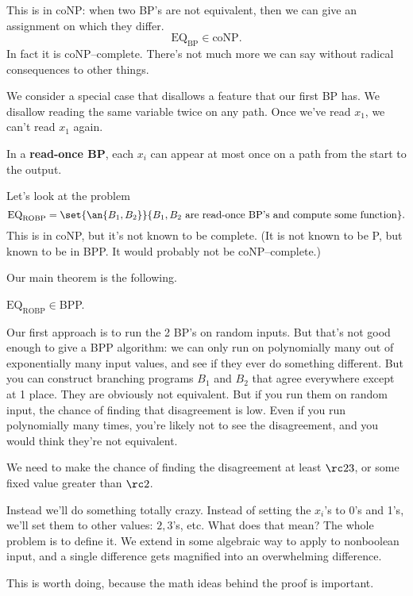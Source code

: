 
This is in coNP: when two BP's are not equivalent, then we can give an assignment on which they differ.
\[
\text{EQ}_{\text{BP}}\in \text{coNP}.
\]
In fact it is coNP--complete. 
There's not much more we can say without radical consequences to other things.

We consider a special case that disallows a feature that our first BP has. We disallow reading the same variable twice on any path. Once we've read $x_1$, we can't read $x_1$ again. %
\begin{df}
In a \textbf{read-once BP}, each $x_i$ can appear at most once on a path from the start to the output. %
\end{df}
Let's look at the problem
\[
\text{EQ}_{\text{ROBP}}=\set{\an{B_1,B_2}}{B_1,B_2\text{ are read-once BP's and compute some function}}.
\]
This is in coNP, but it's not known to be complete. (It is not known to be P, but known to be in BPP. It would probably not be coNP--complete.)

Our main theorem is the following.
\begin{thm}
$
\text{EQ}_{\text{ROBP}}\in $BPP.
\end{thm}
Our first approach is to run the 2 BP's on random inputs. But that's not good enough to give a BPP algorithm: we can only run on polynomially many out of exponentially many input values, and see if they ever do something different. But you can construct branching programs $B_1$ and $B_2$ that agree everywhere except at 1 place. They are obviously not equivalent. But if you run them on random input, the chance of finding that disagreement is low. Even if you run polynomially many times, you're likely not to see the disagreement, and you would think they're not equivalent.

We need to make the chance of finding the disagreement at least $\rc23$, or some fixed value greater than $\rc2$.

Instead we'll do something totally crazy. Instead of setting the $x_i$'s to 0's and 1's, we'll set them to other values: $2,3$'s, etc. What does that mean? The whole problem is to define it. We extend in some algebraic way to apply to nonboolean input,
and a single difference gets magnified into an overwhelming difference.

This is worth doing, because the math ideas behind the proof is important.

